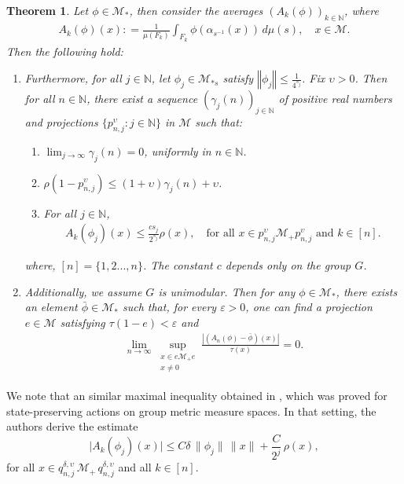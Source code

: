 \documentclass[11pt]{amsart}
\newtheorem{thm}{Theorem}[section]
\theoremstyle{definition}
\theoremstyle{myremark}
\numberwithin{equation}{section}
\def\N{\mathbb N}
\newcommand{\CM}{\mathcal{M}}
\newcommand{\ups}{\upsilon}
\newcommand{\abs}[1]{\left\vert#1\right\vert}
\newcommand{\norm}[1]{\left\Vert#1\right\Vert}
\begin{document}
\begin{thm}\label{main thm}
    Let \( \phi \in \mathcal{M}_* \),  then  consider the averages \( (A_k(\phi))_{k \in \mathbb{N}} \), where  
    \begin{align*}
        A_k(\phi)(x) : = \frac{1}{\mu(F_k)} \int_{F_k} \phi(\alpha_{ s^{-1}}(x)) \, d\mu(s), \quad x \in \mathcal{M}.
    \end{align*}
    Then the following hold:  \\
    \begin{enumerate}\setlength\itemsep{.7em}
      
\item Furthermore, for all $j \in \N$, let $\phi_j \in \CM_{* s}$ satisfy $\norm{\phi_j} \leq \frac{1}{4^{s_j}}$. Fix $ \ups > 0$. Then for all $n \in \N$, there exist a sequence $\left(\gamma_j(n)\right)_{j \in \N}$ of positive real numbers and projections $\{p^{\ups}_{n,j} : j \in \N\}$ in $\CM$ such that:
	\begin{enumerate}\setlength\itemsep{.7em} 
		\item $ \displaystyle \lim_{j \to \infty} \gamma_j(n) = 0$, uniformly in $n \in \N$.  
		\item $\rho(1 - p^{ \ups}_{n,j}) \leq (1 + \ups)\gamma_j(n) + \ups$.  
		\item For all $j \in \N$,
		\begin{align}\label{max-cond-0}
		    A_k(\phi_j)(x) \leq  \frac{c s_j}{2^{s_j}} \rho(x), \quad \text{for all } x \in p^{ \ups}_{n,j} \CM_+ p^{\ups}_{n,j} \text{ and } k \in [n].
		\end{align}
	\end{enumerate}
	where, $[n]=\{1,2...,n\}$. The constant $c$ depends only on the group $G$.


\item 
Additionally,  we assume $G$ is unimodular. Then for any $\phi \in \mathcal{M}_*$, there exists an element $\bar{\phi} \in \mathcal{M}_*$ such that, for every $\varepsilon > 0$, one can find a projection $e \in \mathcal{M}$ satisfying $\tau(1-e) < \varepsilon$ and
	\begin{align*}
		\lim_{n \to \infty}
		\sup_{\substack{x \in e\mathcal{M}_+e \\ x \neq 0}}
		\frac{\abs{(A_n(\phi) - \bar{\phi})(x)}}{\tau(x)} = 0 .
	\end{align*}



    \end{enumerate}
\end{thm}
We note that an similar maximal inequality obtained in \cite[Corollary~3.18]{Bik-Dip-Amenable}, which was proved for state-preserving actions on group metric measure spaces. In that setting, the authors derive the estimate
\[
\lvert A_k(\phi_j)(x) \rvert 
\leq C \delta \, \|\phi_j\|\, \|x\|
+ \frac{C}{2^j}\, \rho(x),
\]
for all $x \in q^{\delta,\ups}_{n,j}\, \CM_+\, q^{\delta,\ups}_{n,j}$ and all $k \in [n]$.
\end{document}
